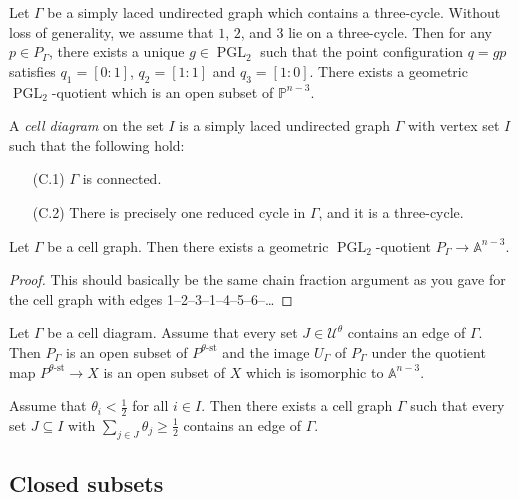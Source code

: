 \documentclass[11pt, a4paper]{amsart}
\begin{document}
	\begin{rem}
		Let \(\Gamma\) be a simply laced undirected graph which contains a three-cycle. 
		Without loss of generality, we assume that \(1\), \(2\), and \(3\) lie on a three-cycle. 
		Then for any \(p \in P_\Gamma\), there exists a unique \(g \in \operatorname{PGL}_2\) such that the point configuration \(q = gp\) satisfies \(q_1 = [0:1]\), \(q_2 = [1:1]\) and \(q_3 = [1:0]\). 
		There exists a geometric \(\operatorname{PGL}_2\)-quotient which is an open subset of \(\mathbb{P}^{n-3}\).
	\end{rem}

	\begin{defn}
		A \emph{cell diagram} on the set \(I\) is a simply laced undirected graph \(\Gamma\) with vertex set \(I\) such that the following hold:
		\begin{enumerate}
			\item[(C.1)] \(\Gamma\) is connected.
			\item[(C.2)] There is precisely one reduced cycle in \(\Gamma\), and it is a three-cycle. 
		\end{enumerate}
	\end{defn}

	\begin{lem}
		Let \(\Gamma\) be a cell graph. 
		Then there exists a geometric \(\operatorname{PGL}_2\)-quotient \(P_{\Gamma} \to \mathbb{A}^{n-3}\).
	\end{lem}

	\begin{proof}
		This should basically be the same chain fraction argument as you gave for the cell graph with edges 1--2--3--1--4--5--6--\ldots
	\end{proof}

	Let \(\Gamma\) be a cell diagram. 
	Assume that every set \(J \in \mathcal{U}^\theta\) contains an edge of \(\Gamma\). 
	Then \(P_\Gamma\) is an open subset of \(P^{\theta\text{-st}}\) and the image \(U_\Gamma\) of \(P_\Gamma\) under the quotient map \(P^{\theta\text{-st}} \to X\) is an open subset of \(X\) which is isomorphic to \(\mathbb{A}^{n-3}\).

	\begin{claim}
		Assume that \(\theta_i < \frac{1}{2}\) for all \(i \in I\). 
		Then there exists a cell graph \(\Gamma\) such that every set \(J \subseteq I\) with \(\sum_{j \in J} \theta_j \geq \frac{1}{2}\) contains an edge of \(\Gamma\).
	\end{claim}

	\subsection*{Closed subsets}
\end{document}
